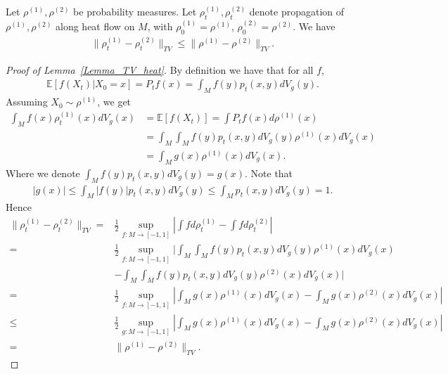 \begin{lemma}\label{Lemma_TV_heat}
    Let $\rho^{(1)}, \rho^{(2)}$ be probability measures. 
    Let $\rho^{(1)}_{t}, \rho^{(2)}_{t}$ denote propagation of $\rho^{(1)}, \rho^{(2)}$ along heat flow on $M$, with $\rho^{(1)}_{0} = \rho^{(1)}$, $\rho^{(2)}_{0} = \rho^{(2)}$.
    We have 
    \begin{align*}
        \|\rho^{(1)}_{t} - \rho^{(2)}_{t}\|_{TV} \le \|\rho^{(1)} - \rho^{(2)}\|_{TV}.
    \end{align*}
\end{lemma}
\begin{proof}[Proof of Lemma~\ref{Lemma_TV_heat}]
    By definition we have that for all $f$, 
    \begin{align*}
        \mathbb{E}[f(X_{t}) | X_{0} = x] = P_{t} f(x) = \int_{M} f(y) p_{t} (x, y) dV_{g}(y).
    \end{align*}
    Assuming $X_{0} \sim \rho^{(1)}$, we get 
    \begin{align*}
            \int_{M} f(x) \rho^{(1)}_{t}(x) dV_{g}(x) &= \mathbb{E}[f(X_{t})] 
            = \int P_{t} f(x) d\rho^{(1)}(x) \\
            &= \int_{M} \int_{M} f(y) p_{t} (x, y) dV_{g} (y)\rho^{(1)}(x) dV_{g}(x) \\
            &= \int_{M} g(x) \rho^{(1)}(x) dV_{g}(x).
    \end{align*}
    Where we denote $\int_{M} f(y) p_{t} (x, y) dV_{g}(y) = g(x)$.
    Note that 
    \begin{align*}
        |g(x)| \le \int_{M} |f(y)| p_{t} (x, y) dV_{g}(y) \le \int_{M} p_{t} (x, y) dV_{g}(y) = 1.
    \end{align*}
    Hence 
    \begin{align*}
            \|\rho^{(1)}_{t} - \rho^{(2)}_{t}\|_{TV} 
            =& \frac{1}{2} \sup_{f: M \to [-1, 1]} |\int f d\rho^{(1)}_{t} - \int f d\rho^{(2)}_{t} | \\
            =& \frac{1}{2} \sup_{f: M \to [-1, 1]} |\int_{M} \int_{M} f(y) p_{t} (x, y) dV_{g}(y) \rho^{(1)}(x) dV_{g}(x) \\ 
            & - \int_{M} \int_{M} f(y) p_{t} (x, y) dV_{g}(y) \rho^{(2)}(x) dV_{g}(x) | \\
            =& \frac{1}{2} \sup_{f: M \to [-1, 1]} |\int_{M} g(x) \rho^{(1)}(x) dV_{g}(x) - \int_{M} g(x) \rho^{(2)}(x) dV_{g}(x) | \\
            \le& \frac{1}{2} \sup_{g: M \to [-1, 1]} |\int_{M} g(x) \rho^{(1)}(x) dV_{g}(x) - \int_{M} g(x) \rho^{(2)}(x) dV_{g}(x) | \\
            =& \|\rho^{(1)} - \rho^{(2)}\|_{TV}.
    \end{align*}

\end{proof}


